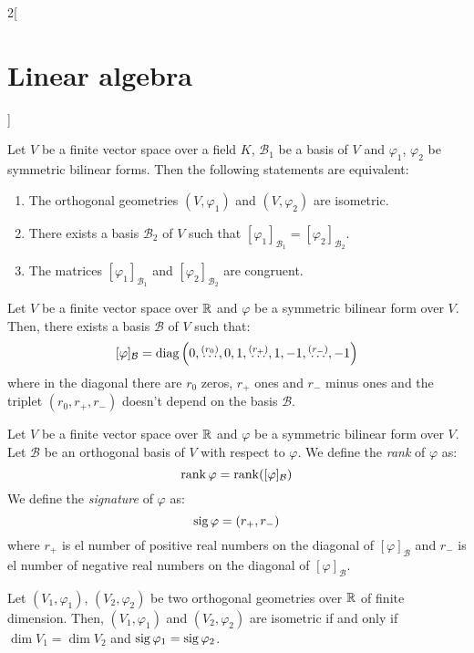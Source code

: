 \documentclass[../../../main.tex]{subfiles}
\begin{document}
\begin{multicols}{2}[\section{Linear algebra}]
\begin{prop}
    Let $V$ be a finite vector space over a field $K$, $\mathcal{B}_1$ be a basis of $V$ and $\varphi_1$, $\varphi_2$ be symmetric bilinear forms. Then the following statements are equivalent:
    \begin{enumerate}
      \item The orthogonal geometries $(V,\varphi_1)$ and $(V,\varphi_2)$ are isometric.
      \item There exists a basis $\mathcal{B}_2$ of $V$ such that $[\varphi_1]_{\mathcal{B}_1}=[\varphi_2]_{\mathcal{B}_2}$.
      \item The matrices $[\varphi_1]_{\mathcal{B}_1}$ and $[\varphi_2]_{\mathcal{B}_2}$ are congruent.
    \end{enumerate}
  \end{prop}
  \begin{theorem}
    Let $V$ be a finite vector space over $\mathbb{R}$ and $\varphi$ be a symmetric bilinear form over $V$. Then, there exists a basis $\mathcal{B}$ of $V$ such that:
    $$[\varphi]_\mathcal{B}=\operatorname{diag}\left(0,\overset{(r_0)}{\ldots},0,1,\overset{(r_+)}{\ldots},1,-1,\overset{(r_-)}{\ldots},-1\right)$$
    where in the diagonal there are $r_0$ zeros, $r_+$ ones and $r_-$ minus ones and the triplet $(r_0,r_+,r_-)$ doesn't depend on the basis $\mathcal{B}$.
  \end{theorem}
  \begin{definition}
    Let $V$ be a finite vector space over $\mathbb{R}$ and $\varphi$ be a symmetric bilinear form over $V$. Let $\mathcal{B}$ be an orthogonal basis of $V$ with respect to $\varphi$. We define the \emph{rank} of $\varphi$ as: $$\rank \varphi=\rank ([\varphi]_\mathcal{B})$$ We define the \emph{signature} of $\varphi$ as: $$\operatorname{sig}\varphi=(r_+,r_-)$$ where $r_+$ is el number of positive real numbers on the diagonal of $[\varphi]_\mathcal{B}$ and $r_-$ is el number of negative real numbers on the diagonal of $[\varphi]_\mathcal{B}$.
  \end{definition}
  \begin{theorem}
    Let $(V_1,\varphi_1)$, $(V_2,\varphi_2)$ be two orthogonal geometries over $\mathbb{R}$ of finite dimension. Then, $(V_1,\varphi_1)$ and $(V_2,\varphi_2)$ are isometric if and only if $\dim V_1=\dim V_2$ and $\operatorname{sig} \varphi_1=\operatorname{sig} \varphi_2$.
  \end{theorem}

\end{multicols}
\end{document}
